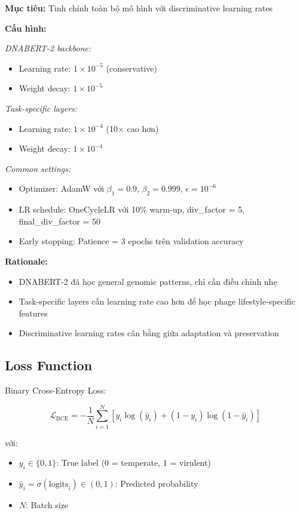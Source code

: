 \textbf{Mục tiêu:} Tinh chỉnh toàn bộ mô hình với discriminative learning rates

\textbf{Cấu hình:}

\textit{DNABERT-2 backbone:}
\begin{itemize}
    \item Learning rate: $1 \times 10^{-5}$ (conservative)
    \item Weight decay: $1 \times 10^{-5}$
\end{itemize}

\textit{Task-specific layers:}
\begin{itemize}
    \item Learning rate: $1 \times 10^{-4}$ (10× cao hơn)
    \item Weight decay: $1 \times 10^{-4}$
\end{itemize}

\textit{Common settings:}
\begin{itemize}
    \item Optimizer: AdamW với $\beta_1 = 0.9$, $\beta_2 = 0.999$, $\epsilon = 10^{-6}$
    \item LR schedule: OneCycleLR với 10\% warm-up, div\_factor = 5, final\_div\_factor = 50
    \item Early stopping: Patience = 3 epochs trên validation accuracy
\end{itemize}

\textbf{Rationale:}
\begin{itemize}
    \item DNABERT-2 đã học general genomic patterns, chỉ cần điều chỉnh nhẹ
    \item Task-specific layers cần learning rate cao hơn để học phage lifestyle-specific features
    \item Discriminative learning rates cân bằng giữa adaptation và preservation
\end{itemize}

\subsection{Loss Function}

Binary Cross-Entropy Loss:

\begin{equation}
\mathcal{L}_{\text{BCE}} = -\frac{1}{N}\sum_{i=1}^{N} \left[y_i \log(\hat{y}_i) + (1-y_i)\log(1-\hat{y}_i)\right]
\end{equation}

với:
\begin{itemize}
    \item $y_i \in \{0, 1\}$: True label (0 = temperate, 1 = virulent)
    \item $\hat{y}_i = \sigma(\text{logits}_i) \in (0, 1)$: Predicted probability
    \item $N$: Batch size
\end{itemize}

